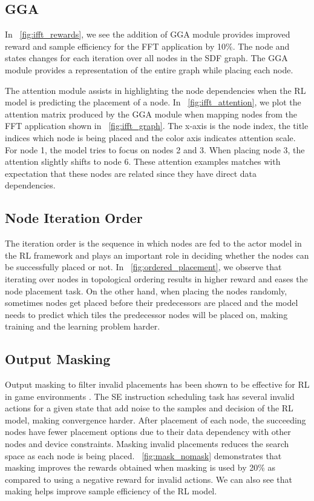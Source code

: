 \subsection{GGA} \label{sec:GGA_result}

In \figurename~\ref{fig:ifft_rewards}, we see the addition of GGA module provides improved reward and sample efficiency for the FFT application by 10\%. 
The node and states changes for each iteration over all nodes in the SDF graph. The GGA module provides a representation of the entire graph while placing each node.

The attention module assists in highlighting the node dependencies when the RL model is predicting the placement of a node. 
In \figurename~\ref{fig:ifft_attention}, we plot the attention matrix produced by the GGA module when mapping nodes from the FFT application shown in \figurename~\ref{fig:ifft_graph}. 
The x-axis is the node index, the title indices which node is being placed and the color axis indicates attention scale.
For node 1, the model tries to focus on nodes 2 and 3. When placing node 3, the attention slightly shifts to node 6. 
These attention examples matches with expectation that these nodes are related since they have direct data dependencies. 

\subsection{Node Iteration Order}

The iteration order is the sequence in which nodes are fed to the actor model in the RL framework and plays an important role in deciding whether the nodes can be successfully placed or not. 
In \figurename~\ref{fig:ordered_placement}, we observe that iterating over nodes in topological ordering results in higher reward and eases the node placement task. 
On the other hand, when placing the nodes randomly, sometimes nodes get placed before their predecessors are placed and the model needs to predict which tiles the predecessor nodes will be placed on, making training and the learning problem harder.

\subsection{Output Masking}
\label{subsec:output_masking}
Output masking to filter invalid placements has been shown to be effective for RL in game environments \cite{Shengyi_mask}. 
The SE instruction scheduling task has several invalid actions for a given state that add noise to the samples and decision of the RL model, making convergence harder. 
After placement of each node, the succeeding nodes have fewer placement options due to their data dependency with other nodes and device constraints.
Masking invalid placements reduces the search space as each node is being placed. 
\figurename~\ref{fig:mask_nomask} demonstrates that masking improves the rewards obtained when masking is used by 20\% as compared to using a negative reward for invalid actions. We can also see that making helps improve sample efficiency of the RL model.

